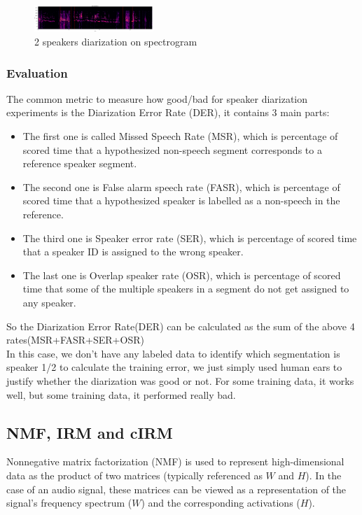 \documentclass[journal, a4paper]{IEEEtran}
\begin{document}
\begin{figure}[h!]
    \centering  
     \caption{\label{Fig:speaker diarization 2}2 speakers diarization on spectrogram}  
    \includegraphics[width=0.4\textwidth]{kmeans02.png}
\end{figure}
\subsubsection{Evaluation\cite{Segmentation}}The common metric to measure how good/bad for speaker diarization experiments is the Diarization Error Rate (DER), it contains 3 main parts:
\begin{itemize}
    \item The first one is called Missed Speech Rate (MSR), which is percentage of scored time that a hypothesized non-speech segment corresponds to a reference speaker segment.
    \item The second one is False alarm speech rate (FASR), which is percentage of scored time that a hypothesized speaker is labelled as a non-speech in the reference.
    \item The third one is Speaker error rate (SER), which is percentage of scored time that a speaker ID is assigned to the wrong speaker.
    \item The last one is Overlap speaker rate (OSR), which is percentage of scored time that some of the multiple speakers in a segment do not get assigned to any speaker.
\end{itemize}

So the Diarization Error Rate(DER) can be calculated as the sum of the above 4 rates(MSR+FASR+SER+OSR)\\
In this case, we don't have any labeled data to identify which segmentation is speaker 1/2 to calculate the training error, we just simply used human ears to justify whether the diarization was good or not. For some training data, it works well, but some training data, it performed really bad. 

\subsection{NMF, IRM and cIRM}
Nonnegative matrix factorization (NMF) is used to represent high-dimensional data as the product of two matrices (typically referenced as $W$ and $H$). In the case of an audio signal, these matrices can be viewed as a representation of the signal's frequency spectrum ($W$) and the corresponding activations ($H$).
\end{document}
